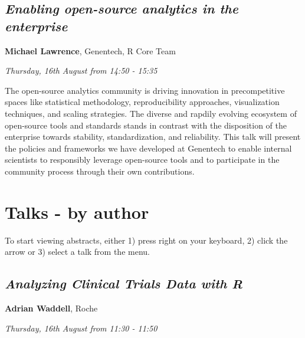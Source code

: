 \documentclass[]{book}
\theoremstyle{definition}
\theoremstyle{definition}
\theoremstyle{definition}
\theoremstyle{remark}
\begin{document}
\hypertarget{enabling-open-source-analytics-in-the-enterprise}{%
\section{\texorpdfstring{\emph{Enabling open-source analytics in the
enterprise}}{Enabling open-source analytics in the enterprise}}\label{enabling-open-source-analytics-in-the-enterprise}}

\textbf{Michael Lawrence}, Genentech, R Core Team

\emph{Thursday, 16th August from 14:50 - 15:35}

The open-source analytics community is driving innovation in
precompetitive spaces like statistical methodology, reproducibility
approaches, visualization techniques, and scaling strategies. The
diverse and rapdily evolving ecosystem of open-source tools and
standards stands in contrast with the disposition of the enterprise
towards stability, standardization, and reliability. This talk will
present the policies and frameworks we have developed at Genentech to
enable internal scientists to responsibly leverage open-source tools and
to participate in the community process through their own contributions.

\hypertarget{talks---by-author}{%
\chapter{Talks - by author}\label{talks---by-author}}

To start viewing abstracts, either 1) press right on your keyboard, 2)
click the arrow or 3) select a talk from the menu.

\hypertarget{analyzing-clinical-trials-data-with-r}{%
\section{\texorpdfstring{\emph{Analyzing Clinical Trials Data with
R}}{Analyzing Clinical Trials Data with R}}\label{analyzing-clinical-trials-data-with-r}}

\textbf{Adrian Waddell}, Roche

\emph{Thursday, 16th August from 11:30 - 11:50}
\end{document}
